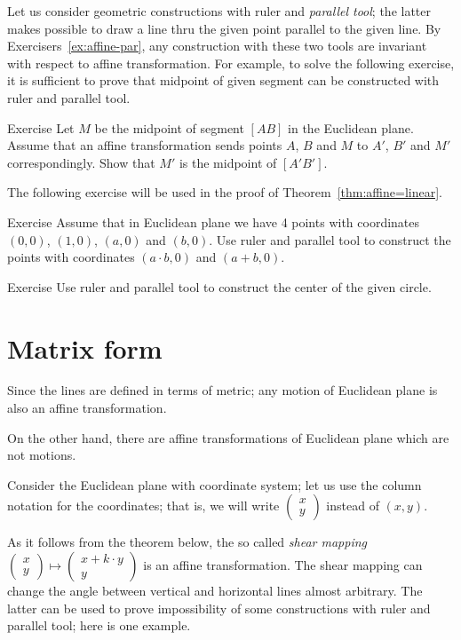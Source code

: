 Let us consider geometric constructions with ruler and \emph{parallel tool};
the latter makes possible to draw a line thru the given point parallel to the given line.
By Exercisers~\ref{ex:affine-par}, any construction with these two tools are invariant with respect to affine transformation.
For example, 
to solve the following exercise,
it is sufficient to prove that midpoint of given segment can be constructed with ruler and parallel tool.

\begin{thm}{Exercise}\label{ex:midpoint-affine}
Let $M$ be the midpoint of segment $[AB]$ in the Euclidean plane.
Assume that an affine transformation sends points $A$, $B$ and $M$
to $A'$, $B'$ and $M'$ correspondingly.
Show that $M'$ is the midpoint of $[A'B']$.
\end{thm}

The following exercise will be used in the proof of Theorem~\ref{thm:affine=linear}.

\begin{thm}{Exercise}\label{ex:R-hom}
Assume that in Euclidean plane we have 4 points with coordinates 
$(0,0)$, $(1,0)$, $(a,0)$ and $(b,0)$.
Use ruler and parallel tool to construct the points with coordinates $(a\cdot b,0)$ and $(a+b,0)$.
\end{thm}

\begin{thm}{Exercise}\label{ex:center-circ-affine}
Use ruler and parallel tool to construct the center of the given circle.
\end{thm}

\section*{Matrix form}

Since the lines are defined in terms of metric;
any motion of Euclidean plane is also an affine transformation.

On the other hand, 
there are affine transformations of Euclidean plane which are not motions.

Consider the Euclidean plane with coordinate system;
let us use the column notation for the coordinates;
that is, we will write $\left(\begin{smallmatrix}
x\\y
\end{smallmatrix} \right)$ instead of $(x,y)$.

As it follows from the theorem below,
the so called {}\emph{shear mapping} $\left(\begin{smallmatrix}
x\\ y
\end{smallmatrix} \right)\mapsto \left(\begin{smallmatrix}
x+k\cdot y\\ y
\end{smallmatrix} \right)$ is an affine transformation.
The shear mapping can change the angle between vertical and horizontal lines almost arbitrary.
The latter can be used to prove impossibility of some constructions with ruler and parallel tool;
here is one example.

